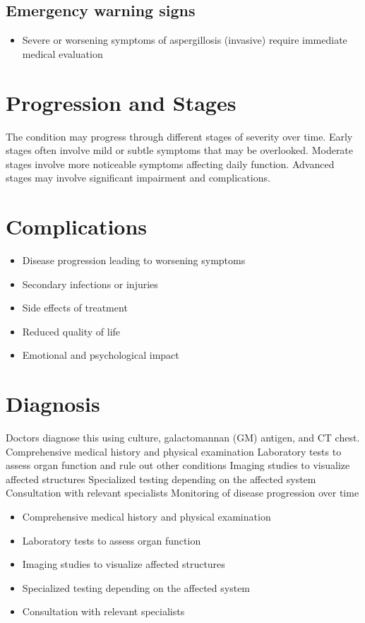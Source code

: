 \subsection{Emergency warning signs}
\begin{itemize}[noitemsep]
  \item Severe or worsening symptoms of aspergillosis (invasive) require immediate medical evaluation
\end{itemize}
\section{Progression and Stages}
The condition may progress through different stages of severity over time. Early stages often involve mild or subtle symptoms that may be overlooked. Moderate stages involve more noticeable symptoms affecting daily function. Advanced stages may involve significant impairment and complications.
\section{Complications}
\begin{itemize}[noitemsep]
  \item Disease progression leading to worsening symptoms
  \item Secondary infections or injuries
  \item Side effects of treatment
  \item Reduced quality of life
  \item Emotional and psychological impact
\end{itemize}
\section{Diagnosis}
Doctors diagnose this using culture, galactomannan (GM) antigen, and CT chest. Comprehensive medical history and physical examination Laboratory tests to assess organ function and rule out other conditions Imaging studies to visualize affected structures Specialized testing depending on the affected system Consultation with relevant specialists Monitoring of disease progression over time

\begin{itemize}[noitemsep]
  \item Comprehensive medical history and physical examination
  \item Laboratory tests to assess organ function
  \item Imaging studies to visualize affected structures
  \item Specialized testing depending on the affected system
  \item Consultation with relevant specialists
\end{itemize}

